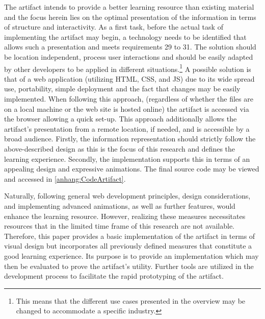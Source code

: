 The artifact intends to provide a better learning resource than existing material and the focus herein lies on the optimal presentation of the information in terms of structure and interactivity. As a first task, before the actual task of implementing the artifact may begin, a technology needs to be identified that allows such a presentation and meets requirements 29 to 31. The solution should be location independent, process user interactions and should be easily adapted by other developers to be applied in different situations.\footnote{This means that the different use cases presented in the overview may be changed to accommodate a specific industry.} A possible solution is that of a web application (utilizing \ac{HTML}, \ac{CSS}, and \ac{JS}) due to its wide spread use, portability, simple deployment and the fact that changes may be easily implemented. When following this approach, (regardless of whether the files are on a local machine or the web site is hosted online) the artifact is accessed via the browser allowing a quick set-up. This approach additionally allows the artifact's presentation from a remote location, if needed, and is accessible by a broad audience. Firstly, the information representation should strictly follow the above-described design as this is the focus of this research and defines the learning experience. Secondly, the implementation supports this in terms of an appealing design and expressive animations. The final source code may be viewed and accessed in \ref{anhang:CodeArtifact}.

Naturally, following general web development principles, design considerations, and implementing advanced animations, as well as further features, would enhance the learning resource. However, realizing these measures necessitates resources that in the limited time frame of this research are not available. Therefore, this paper provides a basic implementation of the artifact in terms of visual design but incorporates all previously defined measures that constitute a good learning experience. Its purpose is to provide an implementation which may then be evaluated to prove the artifact's utility. Further tools are utilized in the development process to facilitate the rapid prototyping of the artifact.


